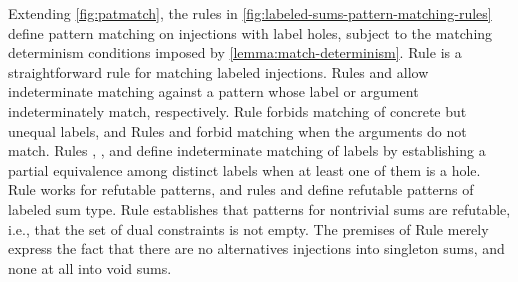 Extending \autoref{fig:patmatch}, the rules in
\autoref{fig:labeled-sums-pattern-matching-rules} define pattern
matching on injections with label holes, subject to the matching
determinism conditions imposed by \autoref{lemma:match-determinism}.
Rule \MInj is a straightforward rule for matching labeled injections.
Rules \MMInjTag and \MMInjArg allow indeterminate matching against a
pattern whose label or argument indeterminately match, respectively.
Rule \NMInj forbids matching of concrete but unequal labels, and Rules
\NMInjTag and \NMInjArg forbid matching when the arguments do not
match.  Rules \TMMSym, \TMMHole, and \TMMEHole define indeterminate
matching of labels by establishing a partial equivalence among
distinct labels when at least one of them is a hole.  Rule \MMNotIntro
works for refutable patterns, and rules \RInjMult and \RInjSing define
refutable patterns of labeled sum type.  Rule \RInjMult establishes
that patterns for nontrivial sums are refutable, i.e., that the set of
dual constraints is not empty.  The premises of Rule \RInjSing merely express
the fact that there are no alternatives injections into singleton
sums, and none at all into void sums.


